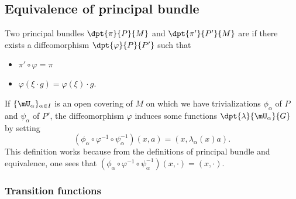 											\subsection{Equivalence of principal bundle}

											Two principal bundles $\dpt{\pi}{P}{M}$ and $\dpt{\pi'}{P'}{M}$ are  if there exists a diffeomorphism $\dpt{\varphi}{P}{P'}$ such that

											\begin{itemize}
											\item  $\pi'\circ\varphi=\pi$
											\item $\varphi(\xi\cdot g)=\varphi(\xi)\cdot g$.
											\end{itemize}

											If $\{\mU_{\alpha}\}_{\alpha\in I}$ is an open covering of $M$ on which we have trivializations $\phi_{\alpha}$ of $P$ and $\psi_{\alpha}$ of $P'$, the diffeomorphism $\varphi$ induces some functions $\dpt{\lambda}{\mU_{\alpha}}{G}$ by setting
											\[
												(\phi_{\alpha}\circ\varphi^{-1}\circ\psi_{\alpha}^{-1})(x,a)=(x,\lambda_{\alpha}(x)a).
												\]
												This definition works because from the definitions of principal bundle and equivalence, one sees that $(\phi_{\alpha}\circ\varphi^{-1}\circ\psi_{\alpha}^{-1})(x,\cdot)=(x,\cdot)$.

												\subsubsection{Transition functions}

